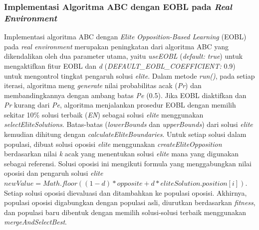 \subsubsection{Implementasi Algoritma ABC dengan EOBL pada \textit{Real Environment}}
Implementasi algoritma ABC dengan \textit{Elite Opposition-Based Learning} (EOBL) pada \textit{real environment} merupakan peningkatan dari algoritma ABC yang dikendalikan oleh dua parameter utama, yaitu \textit{useEOBL} (\textit{default: true}) untuk mengaktifkan fitur EOBL dan \textit{d} (\textit{DEFAULT\_EOBL\_COEFFICIENT:} 0.9) untuk mengontrol tingkat pengaruh solusi \textit{elite}. Dalam metode \textit{run()}, pada setiap iterasi, algoritma meng \textit{generate} nilai probabilitas acak (\textit{Pr}) dan membandingkannya dengan ambang batas \textit{Pe} (0.5). Jika EOBL diaktifkan dan \textit{Pr} kurang dari \textit{Pe}, algoritma menjalankan prosedur EOBL dengan memilih sekitar 10\% solusi terbaik (\textit{EN}) sebagai solusi \textit{elite} menggunakan \textit{selectEliteSolutions}. Batas-batas (\textit{lowerBounds} dan \textit{upperBounds}) dari solusi \textit{elite} kemudian dihitung dengan \textit{calculateEliteBoundaries}. Untuk setiap solusi dalam populasi, dibuat solusi oposisi \textit{elite} menggunakan \textit{createEliteOpposition} berdasarkan nilai \textit{k} acak yang menentukan solusi \textit{elite} mana yang digunakan sebagai referensi. Solusi oposisi ini mengikuti formula yang menggabungkan nilai oposisi dan pengaruh solusi \textit{elite} $newValue = Math.floor((1-d) * opposite + d * eliteSolution.position[i])$. Setiap solusi oposisi dievaluasi dan ditambahkan ke populasi oposisi. Akhirnya, populasi oposisi digabungkan dengan populasi asli, diurutkan berdasarkan \textit{fitness}, dan populasi baru dibentuk dengan memilih solusi-solusi terbaik menggunakan \textit{mergeAndSelectBest}.

